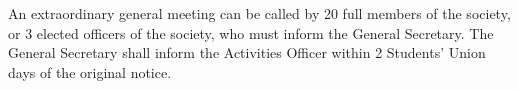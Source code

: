 \begin{clause}
  An extraordinary general meeting can be called by 20 full members of the society, or 3 elected officers of the society, who must inform the General Secretary. The General Secretary shall inform the Activities Officer within 2 Students' Union days of the original notice.
\end{clause}
